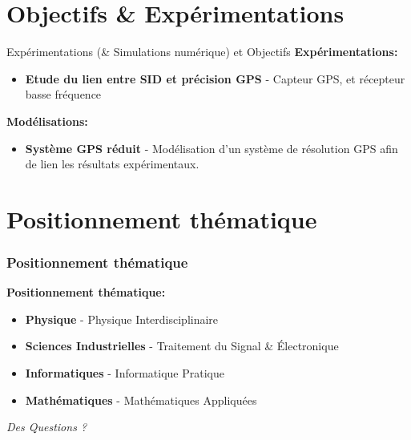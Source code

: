 \documentclass[xcolor=dvipsnames,envcountsect]{beamer}
\renewcommand{\indent}{\hspace*{2em}}
\begin{document}
\section{Objectifs \& Expérimentations}
\begin{frame}{Expérimentations (\& Simulations numérique) et Objectifs}
        \textbf{Expérimentations:} 
	    \begin{itemize}
            \item \textbf{Etude du lien entre SID et précision GPS} - Capteur GPS, et récepteur basse fréquence
        \end{itemize}
        \textbf{Modélisations:} 
	    \begin{itemize}
            \item \textbf{Système GPS réduit} - Modélisation d'un système de résolution GPS afin de lien les résultats expérimentaux.
        \end{itemize}
\end{frame}
\section{Positionnement thématique}
\begin{frame}
	\frametitle{Positionnement thématique}
		\justifying
		\textbf{Positionnement thématique:}
		\begin{itemize}
            \item \textbf{Physique} - Physique Interdisciplinaire
            \item \textbf{Sciences Industrielles} - Traitement du Signal \& Électronique
            \item \textbf{Informatiques} - Informatique Pratique
            \item \textbf{Mathématiques} - Mathématiques Appliquées
        \end{itemize}
\end{frame}
\begin{frame}
		\centering
		\begin{block}
			\scshape
				\begin{center}
					\Huge\emph{Des Questions ?}
				\end{center}
		\end{block}
\end{frame}
\end{document}
